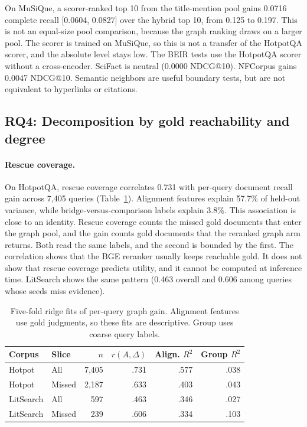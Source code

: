 \documentclass[10pt,twocolumn]{article}
\begin{document}
On MuSiQue, a scorer-ranked top 10 from the title-mention pool gains 0.0716
complete recall [0.0604, 0.0827] over the hybrid top 10, from 0.125 to 0.197.
This is not an equal-size pool comparison, because the graph ranking draws on
a larger pool. The scorer is trained on MuSiQue, so this is not a transfer of
the HotpotQA scorer, and the absolute level stays low. The BEIR tests use the
HotpotQA scorer without a cross-encoder. SciFact is neutral (0.0000 NDCG@10).
NFCorpus gains 0.0047 NDCG@10. Semantic
neighbors are useful boundary tests, but are not equivalent to hyperlinks or
citations.

\subsection{RQ4: Decomposition by gold reachability and degree}

\paragraph{Rescue coverage.}
On HotpotQA, rescue coverage correlates 0.731 with per-query document recall
gain across 7,405 queries (Table~\ref{tab:alignment}). Alignment features
explain 57.7\% of held-out variance, while bridge-versus-comparison labels
explain 3.8\%. This association is close to an identity. Rescue coverage
counts the missed gold documents that enter the graph pool, and the gain counts
gold documents that the reranked graph arm returns. Both read the same labels,
and the second is bounded by the first. The correlation shows that the BGE
reranker usually keeps reachable gold. It does not show that rescue coverage
predicts utility, and it cannot be computed at inference time. LitSearch shows
the same pattern (0.463 overall and 0.606 among queries whose seeds miss
evidence).

\begin{table}[t]
  \centering
  \caption{Five-fold ridge fits of per-query graph gain. Alignment features use
  gold judgments, so these fits are descriptive. Group uses coarse query
  labels.}
  \label{tab:alignment}
  \small
  \setlength{\tabcolsep}{4pt}
  \begin{tabular}{llrrrr}
    \toprule
    Corpus & Slice & $n$ & $r(A,\Delta)$ & Align. $R^2$ & Group $R^2$ \\
    \midrule
    Hotpot & All & 7,405 & .731 & .577 & .038 \\
    Hotpot & Missed & 2,187 & .633 & .403 & .043 \\
    LitSearch & All & 597 & .463 & .346 & .027 \\
    LitSearch & Missed & 239 & .606 & .334 & .103 \\
    \bottomrule
  \end{tabular}
\end{table}
\end{document}
